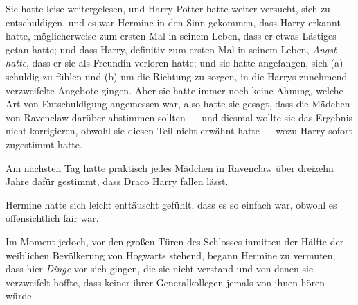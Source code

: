 Sie hatte leise weitergelesen, und Harry Potter hatte weiter versucht, sich zu entschuldigen, und es war Hermine in den Sinn gekommen, dass Harry erkannt hatte, möglicherweise zum ersten Mal in seinem Leben, dass er etwas Lästiges getan hatte; und dass Harry, definitiv zum ersten Mal in seinem Leben, \emph{Angst hatte}, dass er sie als Freundin verloren hatte; und sie hatte angefangen, sich (a) schuldig zu fühlen und (b) um die Richtung zu sorgen, in die Harrys zunehmend verzweifelte Angebote gingen. Aber sie hatte immer noch keine Ahnung, welche Art von Entschuldigung angemessen war, also hatte sie gesagt, dass die Mädchen von Ravenclaw darüber abstimmen sollten — und diesmal wollte sie das Ergebnis nicht korrigieren, obwohl sie diesen Teil nicht erwähnt hatte — wozu Harry sofort zugestimmt hatte.

Am nächsten Tag hatte praktisch jedes Mädchen in Ravenclaw über dreizehn Jahre dafür gestimmt, dass Draco Harry fallen lässt.

Hermine hatte sich leicht enttäuscht gefühlt, dass es so einfach war, obwohl es offensichtlich fair war.

Im Moment jedoch, vor den großen Türen des Schlosses inmitten der Hälfte der weiblichen Bevölkerung von Hogwarts stehend, begann Hermine zu vermuten, dass hier \emph{Dinge} vor sich gingen, die sie nicht verstand und von denen sie verzweifelt hoffte, dass keiner ihrer Generalkollegen jemals von ihnen hören würde.


